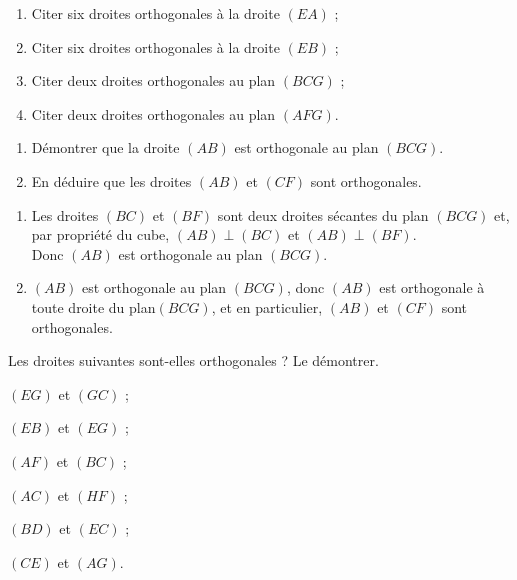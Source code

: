 \documentclass{cornouaille}
\begin{document}
\begin{colonne*exercice}
\begin{exercice}
  \begin{enumerate}
  \item Citer six droites orthogonales à la droite $(EA)$ ;
  \item Citer six droites orthogonales à la droite $(EB)$ ;
  \item Citer deux droites orthogonales au plan $(BCG)$ ;
  \item Citer deux droites orthogonales au plan $(AFG)$.
  \end{enumerate}
\end{exercice}

\begin{exercice*}\label{G2Exo34}
  \begin{enumerate}
  \item Démontrer que la droite $(AB)$ est orthogonale au plan
    $(BCG)$.
  \item En déduire que les droites $(AB)$ et $(CF)$ sont orthogonales.
  \end{enumerate}
\end{exercice*}
\begin{corrige}
  \begin{enumerate}
\item  Les droites $(BC)$ et $(BF)$ sont deux droites sécantes du plan $(BCG)$ et, par propriété du cube, $(AB)\perp(BC)$ et $(AB)\perp(BF)$.\\
Donc $(AB)$ est orthogonale au plan $(BCG)$.
\item  $(AB)$ est orthogonale au plan $(BCG)$, donc $(AB)$ est orthogonale à toute droite du plan$(BCG)$, et en particulier, $(AB)$ et $(CF)$ sont orthogonales.
\end{enumerate}
\end{corrige}

\begin{exercice}
  Les droites suivantes sont-elles orthogonales ? Le démontrer.
  \begin{colenumerate}{2}
  \item $(EG)$ et $(GC)$ ;
  \item $(EB)$ et $(EG)$ ;
  \item $(AF)$ et $(BC)$ ;
  \item $(AC)$ et $(HF)$ ;
  \item $(BD)$ et $(EC)$ ;
  \item $(CE)$ et $(AG)$.
  \end{colenumerate}
\end{exercice}


\end{colonne*exercice}
\end{document}
